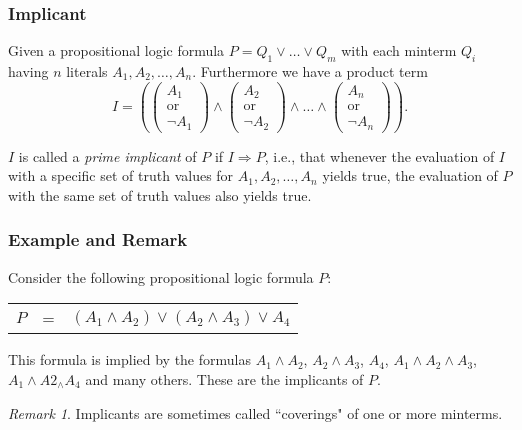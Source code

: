 \documentclass{beamer}
\theoremstyle{remark}
\newtheorem{remark}[theorem]{Remark}
\begin{document}
\begin{frame}
\frametitle{Implicant}

\begin{definition}
Given a propositional logic formula $P = Q_1 \lor \ldots \lor Q_m$ with each minterm $Q_i$ having $n$ literals $A_1, A_2, \ldots, A_n$. Furthermore we have a product term
\[I = \left ( \left ( \begin{matrix}A_1 \\ \text{or} \\ \lnot A_1  \end{matrix} \right ) \land
		\left ( \begin{matrix}A_2 \\ \text{or} \\ \lnot A_2  \end{matrix} \right ) \land \ldots \land
		\left (\begin{matrix}A_n \\ \text{or} \\ \lnot A_n  \end{matrix}\right ) \right ).\]

\pause

$I$ is called a {\em prime implicant} of $P$ if $I \Rightarrow P$, i.e., that whenever the evaluation of $I$ with a specific set of truth values for $A_1, A_2, \ldots, A_n$ yields true, the evaluation of $P$ with the same set of truth values also yields true.
\end{definition}
\end{frame}


\begin{frame}
	\frametitle{Example and Remark}
	
	Consider the following propositional logic formula $P$:
	
	\vspace{1em}
	
	\begin{tabular}{ccc}
	$P$ & = & $(A_1 \land A_2) \lor (A_2 \land A_3) \lor A_4$
	\end{tabular}
	
	\vspace{1em}
	
	This formula is implied by the formulas $A_1 \land A_2$, $A_2 \land A_3$, $A_4$, $A_1 \land A_2 \land A_3$, $A_1 \land A2_ \land A_4$ and many others. These are the implicants of $P$.
	
	\pause
	\begin{remark}
		Implicants are sometimes called ``coverings" of one or more minterms.
	\end{remark}
\end{frame}
\end{document}
